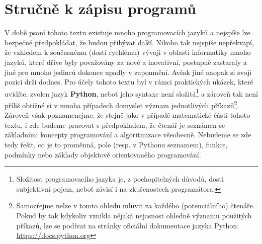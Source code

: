 \section{Stručně k zápisu programů}\label{sec:zapis-programu}

V době psaní tohoto textu existuje mnoho programovacích jazyků a nejspíše lze bezpečně předpokládat, že budou přibývat další. Nikoho tak nejspíše nepřekvapí, že vzhledem k současnému (dosti rychlému) vývoji v oblasti informatiky mnoho jazyků, které dříve byly považovány za nové a inovativní, postupně zastaraly a jiné pro mnoho jedinců dokonce upadly v zapomnění. Avšak jiné naopak si svoji pozici drží dodnes. Pro účely tohoto textu byl v rámci praktických ukázek, které uvidíte, zvolen jazyk \textbf{Python}, neboť jeho syntaxe není složitá\footnote{Složitost programovacího jazyka je, z pochopitelných důvodů, dosti subjektivní pojem, neboť závisí i na zkušenostech programátora.} a zároveň tak není příliš obtížné si v mnoha případech domyslet význam jednotlivých příkazů\footnote{Samozřejme nelze v tomto ohledu mluvit za každého (potenciálního) čtenáře. Pokud by tak kdykoliv vznikla nějaká nejasnost ohledně významu použitých příkazů, lze se podívat na stránky oficiální dokumentace jazyka Python: \url{https://docs.python.org}}. Zároveň však poznamenejme, že stejně jako v případě matematické části tohoto textu, i zde budeme pracovat s předpokladem, že čtenář je seznámen se základními koncepty programování a algoritmizace všeobecně. Nebudeme se zde tedy řešit, co je to proměnná, pole (resp. v Pythonu seznamem), funkce, podmínky nebo základy objektově orientovaného programování.

